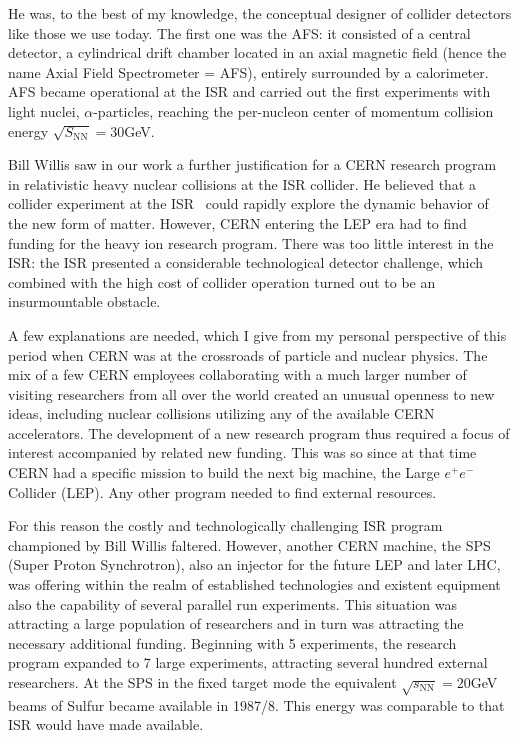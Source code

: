 He was, to the best of my knowledge, the conceptual designer of collider detectors like those we use today. The first one was the AFS: it consisted of a central detector, a cylindrical drift chamber located in an axial magnetic field (hence the name Axial Field Spectrometer = AFS)\label{AFSexp}, entirely surrounded by a calorimeter. AFS became operational at the ISR and carried out the first experiments with light nuclei, $\alpha$-particles, reaching the per-nucleon center of momentum collision energy $\sqrt{S_\mathrm{NN}}=30$\;GeV. 

Bill Willis saw in our work a further justification for a CERN research program in relativistic heavy nuclear collisions at the ISR collider. He believed that a collider experiment at the ISR~\cite{Willis:1981xm} could rapidly explore the dynamic behavior of the new form of matter. However, CERN entering the LEP era had to find funding for the heavy ion research program. There was too little interest in the ISR: the ISR presented a considerable technological detector challenge, which combined with the high cost of collider operation turned out to be an insurmountable obstacle. 

A few explanations are needed, which I give from my personal perspective of this period when CERN was at the crossroads of particle and nuclear physics. The mix of a few CERN employees collaborating with a much larger number of visiting researchers from all over the world created an unusual openness to new ideas, including nuclear collisions utilizing any of the available CERN accelerators. The development of a new research program thus required a focus of interest accompanied by related new funding. This was so since at that time CERN had a specific mission to build the next big machine, the Large $e^+e^-$ Collider (LEP). Any other program needed to find external resources. 

For this reason the costly and technologically challenging ISR program championed by Bill Willis faltered. However, another CERN machine, the SPS (Super Proton Synchrotron), also an injector for the future LEP and later LHC, was offering within the realm of established technologies and existent equipment also the capability of several parallel run experiments. This situation was attracting a large population of researchers and in turn was attracting the necessary additional funding. Beginning with 5 experiments, the research program expanded to 7 large experiments, attracting several hundred external researchers. At the SPS in the fixed target mode the equivalent $\sqrt{s_\mathrm{NN}}=20$\;GeV beams of Sulfur became available in 1987/8. This energy was comparable to that ISR would have made available. 

